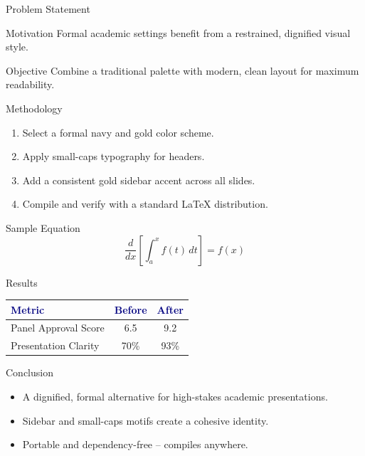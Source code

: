 \documentclass[aspectratio=169]{beamer}
\begin{document}
\begin{frame}{Problem Statement}
\begin{block}{Motivation}
Formal academic settings benefit from a restrained, dignified visual style.
\end{block}
\begin{block}{Objective}
Combine a traditional palette with modern, clean layout for maximum readability.
\end{block}
\end{frame}

\begin{frame}{Methodology}
\begin{enumerate}
  \item Select a formal navy and gold color scheme.
  \item Apply small-caps typography for headers.
  \item Add a consistent gold sidebar accent across all slides.
  \item Compile and verify with a standard \LaTeX{} distribution.
\end{enumerate}
\end{frame}

\begin{frame}{Sample Equation}
\[
\frac{d}{dx}\left[\int_{a}^{x} f(t)\,dt\right] = f(x)
\]
\end{frame}

\begin{frame}{Results}
\begin{table}
\centering
\begin{tabular}{lcc}
\toprule
\textcolor{navy}{\textbf{Metric}} & \textcolor{navy}{\textbf{Before}} & \textcolor{navy}{\textbf{After}} \\
\midrule
Panel Approval Score & 6.5 & 9.2 \\
Presentation Clarity & 70\% & 93\% \\
\bottomrule
\end{tabular}
\end{table}
\end{frame}

\begin{frame}{Conclusion}
\begin{itemize}
  \item A dignified, formal alternative for high-stakes academic presentations.
  \item Sidebar and small-caps motifs create a cohesive identity.
  \item Portable and dependency-free -- compiles anywhere.
\end{itemize}
\end{frame}

\begin{frame}[plain]
\end{frame}
\end{document}
